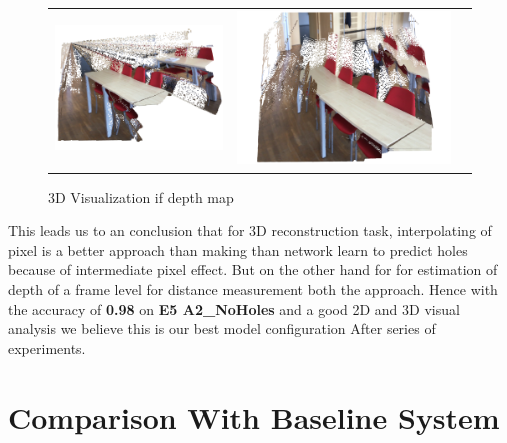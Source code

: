  \begin{figure}[!]
%
\centering\begin{tabular}{c@{ }c@{ }c@{ }}
\includegraphics[width=.5\linewidth]{Figures/results/3D/holes001.png}&
\includegraphics[width=.5\linewidth]{Figures/results/3D/noholes002.png}\\[-1ex]
\end{tabular}
\caption{3D Visualization if depth map}
\label{fig:results_E1_E2}
\end{figure}


This leads us to an conclusion that for 3D reconstruction task, interpolating of pixel is a better approach than making than network learn to predict holes because of intermediate pixel effect. But on the other hand for for estimation of depth of a frame level for distance measurement both the approach. Hence with the accuracy of \textbf{0.98} on \textbf{E5 A2\_NoHoles} and a good 2D and 3D visual analysis we believe this is our best model configuration After series of experiments.


\section{Comparison With Baseline System}
 \label{Chapter6:ComapreS-F-A}


